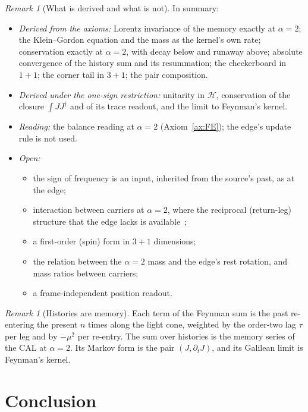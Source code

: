 \documentclass[11pt]{amsart}
\theoremstyle{definition}
\theoremstyle{remark}
\newtheorem{remark}[theorem]{Remark}
\newcommand{\Hil}{\mathcal H}
\begin{document}
\begin{remark}[What is derived and what is not]\label{rem:scope}
In summary:
\begin{itemize}
\item \emph{Derived from the axioms:} Lorentz invariance of the memory exactly at $\alpha=2$; the Klein--Gordon equation and the mass as the kernel's own rate; conservation exactly at $\alpha=2$, with decay below and runaway above; absolute convergence of the history sum and its resummation; the checkerboard in $1+1$; the corner tail in $3+1$; the pair composition.
\item \emph{Derived under the one-sign restriction:} unitarity in $\Hil$, conservation of the closure $\int JJ^\dagger$ and of its trace readout, and the limit to Feynman's kernel.
\item \emph{Reading:} the balance reading at $\alpha=2$ (Axiom~\ref{ax:FE}); the edge's update rule is not used.
\item \emph{Open:}
\begin{itemize}
\item the sign of frequency is an input, inherited from the source's past, as at the edge;
\item interaction between carriers at $\alpha=2$, where the reciprocal (return-leg) structure that the edge lacks is available~\cite[Rem.~7.1]{Edge};
\item a first-order (spin) form in $3+1$ dimensions;
\item the relation between the $\alpha=2$ mass and the edge's rest rotation, and mass ratios between carriers;
\item a frame-independent position readout.
\end{itemize}
\end{itemize}
\end{remark}

\begin{remark}[Histories are memory]
Each term of the Feynman sum is the past re-entering the present $n$ times along the light cone, weighted by the order-two lag $\tau$ per leg and by $-\mu^2$ per re-entry. The sum over histories is the memory series of the CAL at $\alpha=2$. Its Markov form is the pair $(J,\partial_tJ)$, and its Galilean limit is Feynman's kernel.
\end{remark}

\section{Conclusion}
\end{document}

